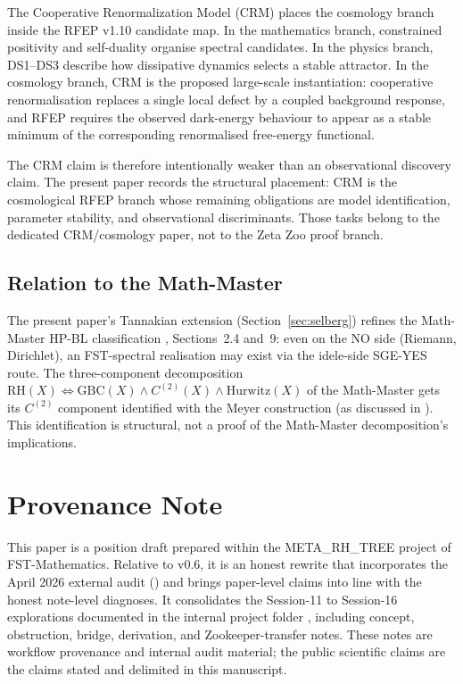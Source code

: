 \documentclass[11pt,a4paper]{article}
\theoremstyle{plain}
\theoremstyle{definition}
\begin{document}
The Cooperative Renormalization Model (CRM) places the cosmology
branch inside the RFEP v1.10 candidate map.  In the mathematics branch, constrained
positivity and self-duality organise spectral candidates.  In the
physics branch, DS1--DS3 describe how dissipative dynamics selects a
stable attractor.  In the cosmology branch, CRM is the proposed
large-scale instantiation: cooperative renormalisation replaces a
single local defect by a coupled background response, and RFEP
requires the observed dark-energy behaviour to appear as a stable
minimum of the corresponding renormalised free-energy functional.

The CRM claim is therefore intentionally weaker than an observational
discovery claim.  The present paper records the structural placement:
CRM is the cosmological RFEP branch whose remaining obligations are
model identification, parameter stability, and observational
discriminants.  Those tasks belong to the dedicated CRM/cosmology
paper, not to the Zeta Zoo proof branch.

\subsection{Relation to the Math-Master}

The present paper's Tannakian extension (Section~\ref{sec:selberg})
refines the Math-Master HP-BL classification
\cite{MathMaster}, Sections~2.4 and~9: even on the NO side (Riemann,
Dirichlet), an FST-spectral realisation may exist via the
idele-side SGE-YES route.  The three-component decomposition
$\mathrm{RH}(X) \iff \mathrm{GBC}(X) \wedge C^{(2)}(X) \wedge
\mathrm{Hurwitz}(X)$ of the Math-Master gets its $C^{(2)}$
component identified with the Meyer construction (as discussed in
\cite{C2LayerStatus}).  This identification is structural, not a
proof of the Math-Master decomposition's implications.

\section*{Provenance Note}

This paper is a position draft prepared within the META\_RH\_TREE
project of FST-Mathematics.  Relative to v0.6, it is an honest
rewrite that incorporates the April 2026 external audit
() and brings paper-level
claims into line with the honest note-level diagnoses.  It
consolidates the Session-11 to Session-16 explorations documented in
the internal project folder , including concept,
obstruction, bridge, derivation, and Zookeeper-transfer notes.  These
notes are workflow provenance and internal audit material; the public
scientific claims are the claims stated and delimited in this
manuscript.
\end{document}
